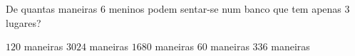 De quantas maneiras $6$ meninos podem sentar-se num banco que tem apenas $3$ lugares?

$120$ maneiras
$3024$ maneiras
$1680$ maneiras
$60$ maneiras
$336$ maneiras



